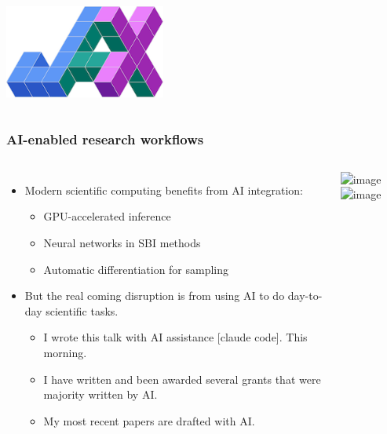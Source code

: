 \documentclass[aspectratio=169]{beamer}
\begin{document}
\begin{frame}
\begin{columns}
        \vspace{10pt}
        \centerline{\includegraphics[width=0.8\textwidth]{figures/jax_logo.png}}
    \end{columns}
\end{frame}

\begin{frame}
    \frametitle{AI-enabled research workflows}
    \begin{columns}
        \begin{itemize}
            \item Modern scientific computing benefits from AI integration:
                \begin{itemize}
                    \item GPU-accelerated inference
                    \item Neural networks in SBI methods
                    \item Automatic differentiation for sampling
                \end{itemize}
            \item But the real coming disruption is from using AI to do day-to-day scientific tasks.
                \begin{itemize}
                    \item I wrote this talk with AI assistance [claude code]. This morning. 
                    \item I have written and been awarded several grants that were majority written by AI.
                    \item My most recent papers are drafted with AI.
                \end{itemize}
        \end{itemize}
        \includegraphics<1>[width=\textwidth]{figures/2025-05-29_10-34-55.png}%
        \includegraphics<2>[width=\textwidth]{figures/2025-05-29_10-37-37.png}%
    \end{columns}
\end{frame}
\end{document}

